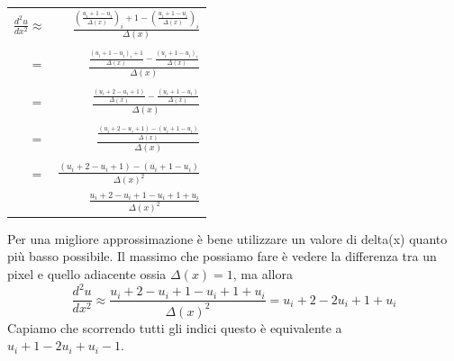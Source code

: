 \begin{table}[htp]              
\centering                      
\begin{tabular}%
{r r}                  %

$\frac{d^2u}{dx^2} \approx$ &
$\frac{
(\frac{u_i+1 - u_i}{\Delta(x)})_i+1 
- 
(\frac{u_i+1 - u_i}{\Delta(x)})_i
}{\Delta(x)}$

\\

\vline

\\
$=$ &
$\frac{
\frac{(u_i+1 - u_i)_i+1}{\Delta(x)} 
- 
\frac{(u_i+1 - u_i)_i}{\Delta(x)}
}{\Delta(x)}$

\\

\vline 

\\
$=$ &
$\frac{
\frac{(u_i+2 - u_i+1)}{\Delta(x)} 
- 
\frac{(u_i+1 - u_i)}{\Delta(x)}
}{\Delta(x)}$

\\

\vline 

\\
$=$ &
$\frac{
\frac{(u_i+2 - u_i+1) 
- 
(u_i+1 - u_i)}{\Delta(x)}
}{\Delta(x)}$

\\

\vline

\\
$=$ &
$\frac{
(u_i+2 - u_i+1) 
- 
(u_i+1 - u_i)}
{\Delta(x)^2}$

\\

\vline &
$\frac{
 u_i+2 - u_i+1 
-u_i+1 + u_i}
{\Delta(x)^2}$
\\

\end{tabular}
\end{table}



Per una migliore approssimazione è bene utilizzare un valore di delta(x) quanto più basso possibile. Il massimo che possiamo fare è vedere la differenza tra un pixel e quello adiacente ossia $\Delta(x)=1$, ma allora 
$$\frac{d^2u}{dx^2} \approx
\frac{
 u_i+2 - u_i+1 
-u_i+1 + u_i}
{\Delta(x)^2} = u_i+2 -2 u_i+1 + u_i$$
Capiamo che scorrendo tutti gli indici questo è equivalente a $u_i+1 -2 u_i + u_i-1.$

